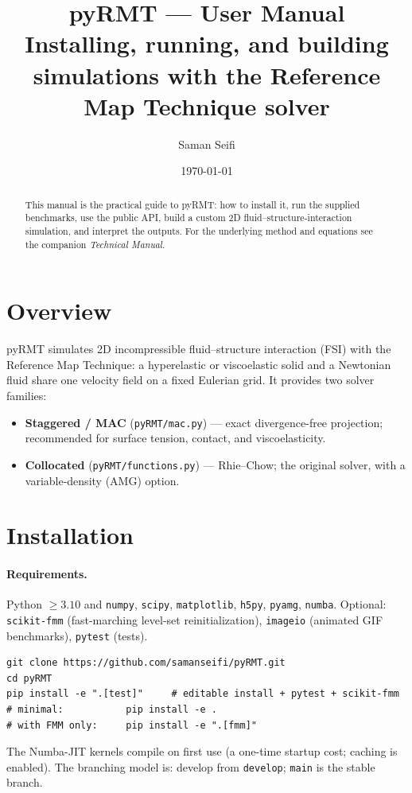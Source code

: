 \documentclass[11pt]{article}
\title{\textbf{pyRMT --- User Manual}\\[2mm]
\large Installing, running, and building simulations with the
Reference Map Technique solver}
\author{Saman Seifi}
\date{\today}
\begin{document}
\maketitle
\begin{abstract}
\noindent
This manual is the practical guide to pyRMT: how to install it, run the supplied
benchmarks, use the public API, build a custom 2D fluid--structure-interaction
simulation, and interpret the outputs. For the underlying method and equations see
the companion \emph{Technical Manual}.
\end{abstract}
\tableofcontents

\section{Overview}
pyRMT simulates 2D incompressible fluid--structure interaction (FSI) with the
Reference Map Technique: a hyperelastic or viscoelastic solid and a Newtonian fluid
share one velocity field on a fixed Eulerian grid. It provides two solver families:
\begin{itemize}[nosep]
  \item \textbf{Staggered / MAC} (\texttt{pyRMT/mac.py}) --- exact divergence-free
  projection; recommended for surface tension, contact, and viscoelasticity.
  \item \textbf{Collocated} (\texttt{pyRMT/functions.py}) --- Rhie--Chow; the
  original solver, with a variable-density (AMG) option.
\end{itemize}

\section{Installation}
\paragraph{Requirements.} Python $\ge 3.10$ and \texttt{numpy}, \texttt{scipy},
\texttt{matplotlib}, \texttt{h5py}, \texttt{pyamg}, \texttt{numba}. Optional:
\texttt{scikit-fmm} (fast-marching level-set reinitialization), \texttt{imageio}
(animated GIF benchmarks), \texttt{pytest} (tests).
\begin{lstlisting}[style=sh]
git clone https://github.com/samanseifi/pyRMT.git
cd pyRMT
pip install -e ".[test]"     # editable install + pytest + scikit-fmm
# minimal:           pip install -e .
# with FMM only:     pip install -e ".[fmm]"
\end{lstlisting}
The Numba-JIT kernels compile on first use (a one-time startup cost; caching is
enabled). The branching model is: develop from \texttt{develop}; \texttt{main} is the
stable branch.
\end{document}
